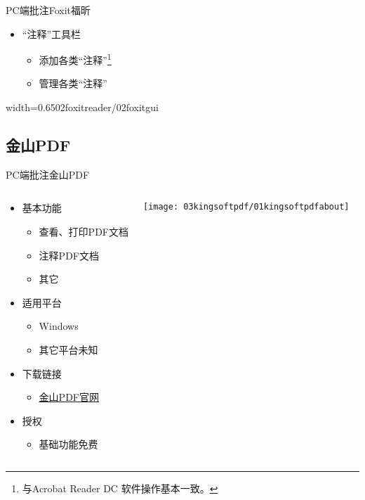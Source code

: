 \documentclass[fontset = none, t, aspectratio=169]{ctexbeamer}
\begin{document}
\begin{frame}{PC端批注}{Foxit福昕}
  \begin{itemize}
  \item \enquote{注释}工具栏
    \begin{itemize}
    \item 添加各类\enquote{注释}\footnote[frame,1]{与Acrobat Reader DC
        软件操作基本一致。}
    \item 管理各类\enquote{注释}
    \end{itemize}
  \end{itemize}
  \begin{center}
    \begin{annotationimage}{width=0.65\textwidth}{02foxitreader/02foxitgui}
    \end{annotationimage}
  \end{center}
\end{frame}


\subsection{金山PDF}
\begin{frame}{PC端批注}{金山PDF}
  \begin{columns}[c,onlytextwidth]
    \begin{spacing}{1.3}
    \begin{itemize}
    \item 基本功能
      \begin{itemize}
      \item 查看、打印PDF文档
      \item \alert{注释}PDF文档
      \item 其它
      \end{itemize}
    \item 适用平台
      \begin{itemize}
      \item Windows
      \item 其它平台未知
      \end{itemize}
    \item 下载链接
      \begin{itemize}
        \item \href{https://www.wps.cn/product/kingsoftpdf/}{金山PDF官网}
      \end{itemize}
    \item 授权
      \begin{itemize}
      \item 基础功能\alert{免费}
      \end{itemize}
    \end{itemize}
    \end{spacing}
    \texttt{[image: 03kingsoftpdf/01kingsoftpdfabout]}
  \end{columns}
\end{frame}
\end{document}
